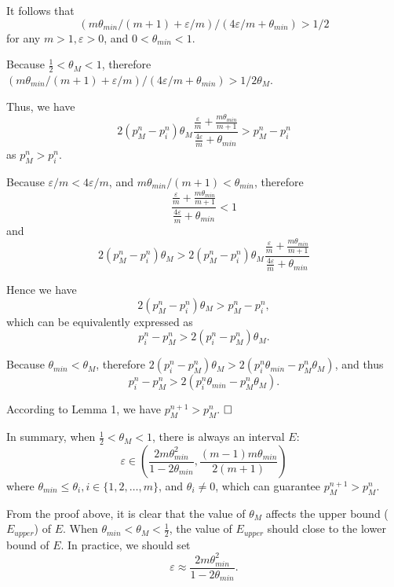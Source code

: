 \documentclass[10pt,journal,cspaper,compsoc,onecolumn]{IEEEtran}
\begin{document}
It follows that
$$(m\theta_{min}/(m + 1) + \varepsilon/m)/(4\varepsilon/m + \theta_{min}) > 1/2$$ for any $m > 1, \varepsilon > 0$, and $0 < \theta_{min} < 1$.

Because $\frac{1}{2} < \theta_M < 1$, therefore
$(m\theta_{min}/(m + 1) + \varepsilon/m)/(4\varepsilon/m + \theta_{min}) > 1/2\theta_M$.

Thus, we have
$$2(p_M^n -p_i^n)\theta_M\displaystyle\frac{\displaystyle\frac{\varepsilon}{m} +\displaystyle\frac{m\theta_{min}}{m + 1}}{\displaystyle\frac{4\varepsilon}{m} + \theta_{min}} > p_M^n -p_i^n$$
as $p_M^n > p_i^n$.

Because $\varepsilon/m < 4\varepsilon/m$, and $m\theta_{min}/(m + 1) < \theta_{min}$, therefore
$$ \displaystyle\frac{\displaystyle\frac{\varepsilon}{m} +\displaystyle\frac{m\theta_{min}}{m + 1}}{\displaystyle\frac{4\varepsilon}{m} + \theta_{min}} < 1$$
and
$$ 2(p_M^n -p_i^n)\theta_M > 2(p_M^n -p_i^n)\theta_M\displaystyle\frac{\displaystyle\frac{\varepsilon}{m} +\displaystyle\frac{m\theta_{min}}{m + 1}}{\displaystyle\frac{4\varepsilon}{m} + \theta_{min}}$$

Hence we have
$$2(p_M^n -p_i^n)\theta_M > p_M^n -p_i^n,$$
which can be equivalently expressed as
$$p_i^n -p_M^n > 2(p_i^n - p_M^n)\theta_M.$$

Because $\theta_{min} < \theta_M$, therefore
$2(p_i^n - p_M^n)\theta_M > 2(p_i^n\theta_{min} - p_M^n\theta_M)$, and thus
$$p_i^n -p_M^n > 2(p_i^n\theta_{min} - p_M^n\theta_M).$$

According to Lemma 1, we have $p_M^{n + 1} > p_M^{n}$.
$\hfill{}
\Box$

In summary, when $\frac{1}{2} < \theta_M < 1$, there is always an interval $E$:
\begin{equation}
  \varepsilon \in (\displaystyle\frac{2m\theta_{min}^2}{1 - 2\theta_{min}}, \displaystyle\frac{(m - 1)m\theta_{min}}{2(m + 1)})
\end{equation}
where $\theta_{min} \le \theta_i, i \in \{1, 2, \ldots, m\}$, and $\theta_i \ne 0$, which can guarantee $p_M^{n+1} > p_M^n$.

From the proof above, it is clear that the value of $\theta_M$ affects the upper bound ($E_{upper}$) of $E$.
When $\theta_{min} < \theta_M < \frac{1}{2}$, the value of $E_{upper}$ should close to the lower bound of $E$.
In practice, we should set
\begin{equation}
\label{euqtion:approxValue}
  \varepsilon \approx \frac{2m\theta_{min}^2}{1-2\theta_{min}}.
\end{equation}
\end{document}
